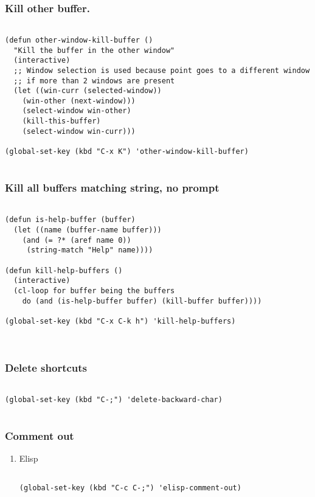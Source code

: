 \documentclass[11pt]{article}
\begin{document}
\subsubsection{Kill other buffer.}
\label{sec:org1cd9797}

\begin{verbatim}

(defun other-window-kill-buffer ()
  "Kill the buffer in the other window"
  (interactive)
  ;; Window selection is used because point goes to a different window
  ;; if more than 2 windows are present
  (let ((win-curr (selected-window))
	(win-other (next-window)))
    (select-window win-other)
    (kill-this-buffer)
    (select-window win-curr)))

(global-set-key (kbd "C-x K") 'other-window-kill-buffer)


\end{verbatim}

\subsubsection{Kill all buffers matching string, no prompt}
\label{sec:org320ce62}
\begin{verbatim}

(defun is-help-buffer (buffer)
  (let ((name (buffer-name buffer)))
    (and (= ?* (aref name 0))
	 (string-match "Help" name))))

(defun kill-help-buffers ()
  (interactive)
  (cl-loop for buffer being the buffers
	do (and (is-help-buffer buffer) (kill-buffer buffer))))

(global-set-key (kbd "C-x C-k h") 'kill-help-buffers)



\end{verbatim}

\subsubsection{Delete shortcuts}
\label{sec:org33fbcd5}
\begin{verbatim}

(global-set-key (kbd "C-;") 'delete-backward-char)


\end{verbatim}

\subsubsection{Comment out}
\label{sec:org77e3c78}
\begin{enumerate}
\item Elisp
\label{sec:orgda4667e}
\begin{verbatim}

(global-set-key (kbd "C-c C-;") 'elisp-comment-out)

\end{verbatim}
\end{enumerate}
\end{document}
